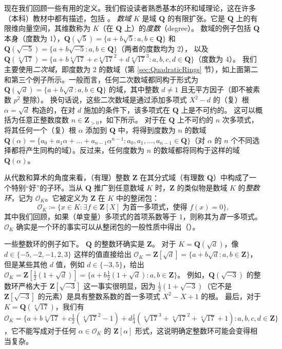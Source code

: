 \documentclass[sigplan,10pt,nonacm,
screen]{acmart} \settopmatter{printfolios=true,printccs=false,printacmref=false}
\newcommand{\QQ}{\mathbf{Q}}
\newcommand{\ZZ}{\mathbf{Z}}
\newcommand{\OK}{\mathcal{O}_K}
\begin{document}
现在我们回顾一些有用的定义。我们假设读者熟悉基本的环和域理论，这在许多（本科）教材中都有描述，包括 \cite{lang2005undergraduate, DummitFoote2004}。
\emph{数域} $K$ 是域 $\QQ$ 的有限扩张。它是 $\QQ$ 上的有限维向量空间，其维数称为 $K$（在 $\QQ$ 上）的\emph{度数}（degree）。
数域的例子包括 $\QQ$ 本身（度数为 1），$\QQ(\sqrt{5})=\{a+b\sqrt{5} : a,b \in \QQ\}$ 和 $\QQ(\sqrt{-5})=\{a+b \sqrt{-5} : a,b \in \QQ\}$（两者的度数均为 2），
以及 $\QQ(\sqrt[4]{17})=\{a+b\sqrt[4]{17}+c \sqrt[4]{17}^2 + d \sqrt[4]{17}^3 : a,b,c,d \in \QQ\}$（度数为 4）。
我们主要使用\emph{二次域}，即度数为 2 的数域（第 \ref{sec:QuadraticRings} 节），如上面第二和第三个例子所示。一般而言，任何二次数域都同构于形式为 $\QQ(\sqrt{d})=\{a+b\sqrt{d} : a, b \in \QQ\}$ 的域，其中整数 $d\not=1$ 且无平方因子（即不被素数 $p^2$ 整除）。
换句话说，这些二次数域是通过添加多项式 $X^2-d$ 的（复）根 $\alpha=\sqrt{d}$ 构造的，在对 $d$ 施加的条件下，该多项式在 $\QQ$ 上是不可约的。
这可以概括为任意正整数度数 $n \in \ZZ_{>0}$，如下所示。
对于在 $\QQ$ 上不可约的 $n$ 次多项式，将其任何一个（复）根 $\alpha$ 添加到 $\QQ$ 中，将得到度数为 $n$ 的数域 $\QQ(\alpha)=\{a_0+a_1 \alpha + \ldots + a_{n-1} \alpha^{n-1} : a_0, a_1, \ldots, a_{n-1} \in \QQ\}$（对 $\alpha$ 的 $n$ 个不同选择都将产生同构的域）。反过来，任何度数为 $n$ 的数域都将同构于这样的域 $\QQ(\alpha)$。

从代数和算术的角度来看，（有理）整数 $\ZZ$ 在其分式域（有理数 $\QQ$）中构成了一个特别“好”的子环。当从 $\QQ$ 推广到任意数域 $K$ 时，$\ZZ$ 的类似物是数域 $K$ 的\emph{整数环}，记为 $\OK$。它被定义为 $\ZZ$ 在 $K$ 中的整闭包：
\begin{equation*}
\OK\coloneqq \{ x \in K : \exists f \in \ZZ[X] \text{ 为首一多项式，使得 } f(x)=0 \},
\end{equation*}
其中我们回顾，如果（单变量）多项式的首项系数等于 $1$，则称其为\emph{首一}多项式。
$\OK$ 确实是一个环的事实可以从整闭包的一般性质中得出（\cite[Section I.2]{Neukirch}）。

一些整数环的例子如下。
$\QQ$ 的整数环确实是 $\ZZ$。
对于 $K= \QQ(\sqrt{d})$，像 $d \in \{-5,-2,-1,2,3\}$ 这样的值直接给出 $\OK=\ZZ[\sqrt{d}]=\{a+b \sqrt{d} : a,b \in \ZZ \}$，
但是某些其他 $d$ 值，例如 $d \in \{-3,5\}$，给出 $\OK=\ZZ[\frac{1}{2}(1+\sqrt{d})]=\{a+b \frac{1}{2}(1+\sqrt{d}) : a,b \in \ZZ \}$。
例如，$\QQ(\sqrt{-3})$ 的整数环严格大于 $\ZZ[\sqrt{-3}]$ 这一事实很明显，因为 $\frac{1}{2}(1+\sqrt{-3})$（它不是 $\ZZ[\sqrt{-3}]$ 的元素）是具有整数系数的首一多项式 $X^2-X+1$ 的根。
最后，对于 $K=\QQ(\sqrt[4]{17})$，我们有 $\OK=\{a+b\sqrt[4]{17}+c\frac{1}{2}(\sqrt[4]{17}^2-1)+d \frac{1}{4}(\sqrt[4]{17}^3+\sqrt[4]{17}^2+\sqrt[4]{17}+1) : a,b,c,d \in \ZZ \}$，它不能写成对于任何 $\alpha \in \OK$ 的 $\ZZ[\alpha]$ 形式，这说明确定整数环可能会变得相当复杂。
\end{document}
